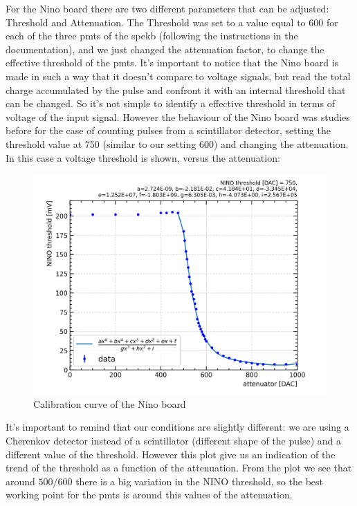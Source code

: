 \documentclass[10pt,a4paper]{article}
\begin{document}
For the Nino board there are two different parameters that can be adjusted: Threshold and Attenuation. The Threshold was set to a value equal to 600 for each of the three pmts of the spekb (following the instructions in the documentation), and we just changed the attenuation factor, to change the effective threshold of the pmts. It's important to notice that the Nino board is made in such a way that it doesn't compare to voltage signals, but read the total charge accumulated by the pulse and confront it with an internal threshold that can be changed. So it's not simple to identify a effective threshold in terms of voltage of the input signal. However the behaviour of the Nino board was studies before for the case of counting pulses from a scintillator detector, setting the threshold value at 750 (similar to our setting 600) and changing the attenuation. In this case a voltage threshold is shown, versus the attenuation: 

\begin{figure}[hbtp]
\centering
\includegraphics[scale= 0.8]{figures/calibrationCurve_mVRange200.png}
\caption{Calibration curve of the Nino board}
\label{fig:Calibration}
\end{figure}

It's important to remind that our conditions are slightly different: we are using a Cherenkov detector instead of a scintillator (different shape of the pulse) and a different value of the threshold. However this plot give us an indication of the trend of the threshold as a function of the attenuation. From the plot we see that around $500/600$ there is a big variation in the NINO threshold, so the best working point for the pmts is around this values of the attenuation.
\end{document}

